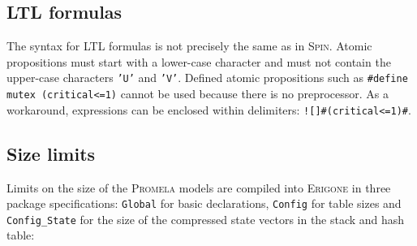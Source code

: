\documentclass[11pt]{article}
\newcommand*{\prg}{\textsc{Erigone}}
\newcommand*{\spn}{\textsc{Spin}}
\newcommand*{\prm}{\textsc{Promela}}
\newcommand*{\p}[1]{\texttt{#1}}
\begin{document}
\subsection*{LTL formulas}
The syntax for LTL formulas is not precisely the same as in \spn{}.
Atomic propositions must start with a lower-case character and must not
contain the upper-case characters \p{'U'} and \p{'V'}. Defined atomic
propositions such as \verb+#define mutex (critical<=1)+ cannot be used
because there is no preprocessor. As a workaround, expressions can be
enclosed within delimiters: \verb+![]#(critical<=1)#+.

\subsection*{Size limits}
Limits on the size of the \prm{} models are compiled into \prg{} in
three package specifications: \p{Global} for basic declarations,
\p{Config} for table sizes and \p{Config\_State} for the size of the
compressed state vectors in the stack and hash table:
\end{document}
